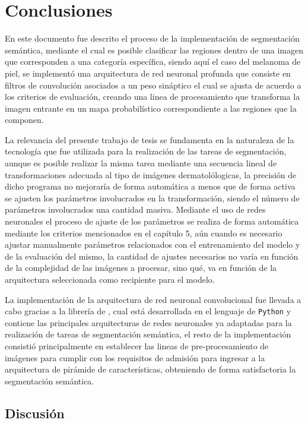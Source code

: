 \chapter{Conclusiones}

En este documento fue descrito el proceso de la implementación de segmentación semántica, mediante el cual es posible clasificar las regiones dentro de una imagen que corresponden a una categoría específica, siendo aquí el caso del melanoma de piel, se implementó una arquitectura de red neuronal profunda que consiste en filtros de convolución asociados a un peso sináptico el cual se ajusta de acuerdo a los criterios de evaluación, creando una linea de procesamiento que transforma la imagen entrante en un mapa probabilístico correspondiente a las regiones que la componen.

La relevancia del presente trabajo de tesis se fundamenta en la naturaleza de la tecnología que fue utilizada para la realización de las tareas de segmentación, aunque es posible realizar la misma tarea mediante una secuencia lineal de transformaciones adecuada al tipo de imágenes dermatolólogicas, la precisión de dicho programa no mejoraría de forma automática a menos que de forma activa se ajusten los parámetros involucrados en la transformación, siendo el número de parámetros involucrados una cantidad masiva. Mediante el uso de redes neuronales el proceso de ajuste de los parámetros se realiza de forma automática mediante los criterios mencionados en el capítulo 5, aún cuando es necesario ajustar manualmente parámetros relacionados con el entrenamiento del modelo y de la evaluación del mismo, la cantidad de ajustes necesarios no varía en función de la complejidad de las imágenes a procesar, sino qué, va en función de la arquitectura seleccionada como recipiente para el modelo.

La implementación de la arquitectura de red neuronal convolucional fue llevada a cabo gracias a la librería de \citet{Yakubovskiy:2019}, cual está desarrollada en el lenguaje de \texttt{Python} y contiene las principales arquitecturas de redes neuronales ya adaptadas para la realización de tareas de segmentación semántica, el resto de la implementación consistió principalmente en establecer las lineas de pre-procesamiento de imágenes para cumplir con los requisitos de admisión para ingresar a la arquitectura de pirámide de características, obteniendo de forma satisfactoria la segmentación semántica.

\section{Discusión}


